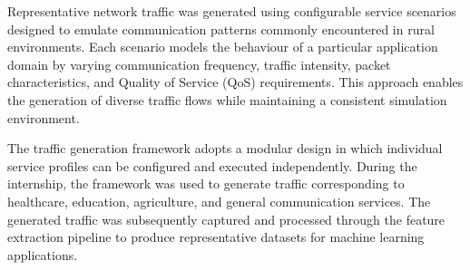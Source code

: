 \documentclass[12pt,a4paper]{report}
\begin{document}
	Representative network traffic was generated using configurable service scenarios designed to emulate communication patterns commonly encountered in rural environments. Each scenario models the behaviour of a particular application domain by varying communication frequency, traffic intensity, packet characteristics, and Quality of Service (QoS) requirements. This approach enables the generation of diverse traffic flows while maintaining a consistent simulation environment.
	
	The traffic generation framework adopts a modular design in which individual service profiles can be configured and executed independently. During the internship, the framework was used to generate traffic corresponding to healthcare, education, agriculture, and general communication services. The generated traffic was subsequently captured and processed through the feature extraction pipeline to produce representative datasets for machine learning applications.
	

	
\end{document}
